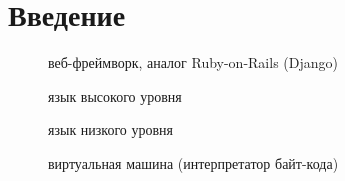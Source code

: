 \section{Введение}


\begin{description}
    \item[\phx] веб-фреймворк, аналог Ruby-on-Rails (Django)
    \item[\ex] язык высокого уровня
    \item[\erl] язык низкого уровня
    \item[\beam] виртуальная машина (интерпретатор байт-кода) 
\end{description}
